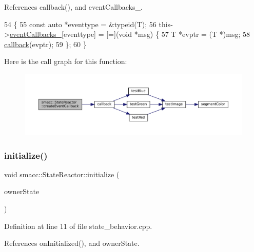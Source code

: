 References callback(), and event\+Callbacks\+\_\+.


\begin{DoxyCode}
54 \{
55     \textcolor{keyword}{const} \textcolor{keyword}{auto} *eventtype = &\textcolor{keyword}{typeid}(T);
56     this->\hyperlink{classsmacc_1_1StateReactor_a63cce05c412f3699cc1b15af9aeaf8af}{eventCallbacks\_}[eventtype] = [=](\textcolor{keywordtype}{void} *msg) \{
57         T *evptr = (T *)msg;
58         \hyperlink{servers_2opencv__perception__node_2opencv__perception__node_8cpp_a050e697bd654facce10ea3f6549669b3}{callback}(evptr);
59     \};
60 \}
\end{DoxyCode}
Here is the call graph for this function\+:
\nopagebreak
\begin{figure}[H]
\begin{center}
\leavevmode
\includegraphics[width=350pt]{classsmacc_1_1StateReactor_ac6b3a604009e5a68123aed27e70cf2be_cgraph}
\end{center}
\end{figure}
\mbox{\label{classsmacc_1_1StateReactor_a5c1d734e3a495fa0f2b01229a3dbac3f}} 
\subsubsection{\texorpdfstring{initialize()}{initialize()}}
{\footnotesize\ttfamily void smacc\+::\+State\+Reactor\+::initialize (\begin{DoxyParamCaption}\item[{\hyperlink{classsmacc_1_1ISmaccState}{smacc\+::\+I\+Smacc\+State} $\ast$}]{owner\+State }\end{DoxyParamCaption})}



Definition at line 11 of file state\+\_\+behavior.\+cpp.



References on\+Initialized(), and owner\+State.


